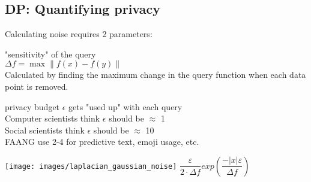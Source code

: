 \documentclass[xor=table]{beamer}
\let\svpar\par
\let\svitemize\itemize
\let\svenditemize\enditemize
\let\svitem\item
\let\svcenter\center
\let\svendcenter\endcenter
\let\svcolumn\column
\let\svendcolumn\endcolumn
\newcommand\stretchoff{%
  \let\par\svpar%
  \let\item\svitem%
  \let\itemize\svitemize%
  \let\enditemize\svenditemize%
  \let\center\svcenter%
  \let\endcenter\svendcenter%
  \let\column\svcolumn%
  \let\endcolumn\svendcolumn%
}
\begin{document}
\subsection*{DP: Quantifying privacy}
\stretchoff


\begin{frame}{Calculating noise requires 2 parameters:}

\begin{minipage}[l]{0.5\linewidth}
	\begin{itemize}
	\item[$\bullet$] "sensitivity" of the query\\
	\begin{center}
	$\Delta f=\max \left\| f\left( x\right) -f\left( y\right) \right\|$ \\
	\end{center}
	Calculated by finding the maximum change in the query function when each data point is removed.
	
\bigskip
	
	\item[$\bullet$] privacy budget $\epsilon$ gets "used up" with each query\\
	Computer scientists think $\epsilon$ should be $\approx$ 1\\
	Social scientists think $\epsilon$ should be $\approx$ 10\\
	FAANG use 2-4 for predictive text, emoji usage, etc.	\\
	
	\end{itemize}
\end{minipage}%
\begin{minipage}[c]{0.5\linewidth}

	\begin{center}
	\texttt{[image: images/laplacian\_gaussian\_noise]}
	$\dfrac {\varepsilon }{2\cdot\Delta f}exp\left( \dfrac {-|x|\varepsilon }{\Delta f}\right) $
	\end{center}

\end{minipage} 


\end{frame}



\end{document}
